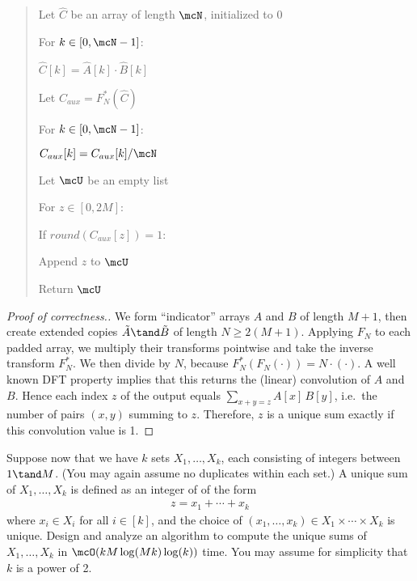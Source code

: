 \documentclass[10pt]{article}
\begin{document}
\begin{quote}
\begin{steps}
  \item Let \( \hat C \) be an array of length \( \mcN \), initialized to 0
  \item For \( k \in [0,\mcN-1] \): 
  \begin{steps}
    \item \( \hat C[k] = \hat A[k] \cdot \hat B[k] \)
  \end{steps}

  \item Let \( C_{aux} = F_N^*(\hat C) \)
  \item For \( k \in [0,\mcN-1] \): 
  \begin{steps}
    \item \( C_{aux}[k] = C_{aux}[k] / \mcN \)
  \end{steps}
  \item Let \( \mcU \) be an empty list
  \item For \( z\in [0,2M] \):
  \begin{steps}
    \item If \( round(C_{aux}[z]) = 1 \):
    \begin{steps}
      \item Append \( z \) to \( \mcU \)
    \end{steps}
  \end{steps}
  \item Return \( \mcU \)
\end{steps}
\end{quote}

\begin{proof}[Proof of correctness.]
  We form ``indicator'' arrays \( A \) and \( B \) of length \( M+1 \), then create extended copies \( \tilde A\tand \tilde B \) of length \( N \ge 2(M+1) \).
Applying \( F_N \) to each padded array,
we multiply their transforms pointwise and take the inverse transform \( F_N^* \). We then
divide by \( N \), because \( F_N^*(F_N(\cdot)) = N \cdot (\cdot) \).
A well known DFT property implies that this returns the (linear) convolution of \( A \) and \( B \).
Hence each index \( z \) of the output equals
\( \sum_{x+y=z} A[x] \, B[y] \), i.e.\ the number of pairs \( (x,y) \) summing to \( z \).
Therefore, \( z \) is a unique sum exactly if this convolution value is 1.
\end{proof}

\pagebreak

\begin{subexercise}
  \item Suppose now that we have \( k \) sets \( X_1,\ldots, X_k \), each consisting of integers between
  \( 1\tand M \). (You may again assume no duplicates within each set.) A unique sum of \( X_1,\ldots, X_k \) is defined as an integer of of the form \begin{align*}
    z = x_1 + \cdots + x_k
  \end{align*} where \( x_i\in X_i \) for all \( i\in [k] \), and the choice of \( (x_1,\ldots,x_k) \in X_1\times \cdots \times X_k \) is unique. Design and analyze an algorithm to compute the unique sums of \( X_1,\ldots,X_k \) in \( \mcO(kM\log(Mk)\log(k)) \) time. You may assume for simplicity that \( k \) is a power of 2.
\end{subexercise}
\end{document}
